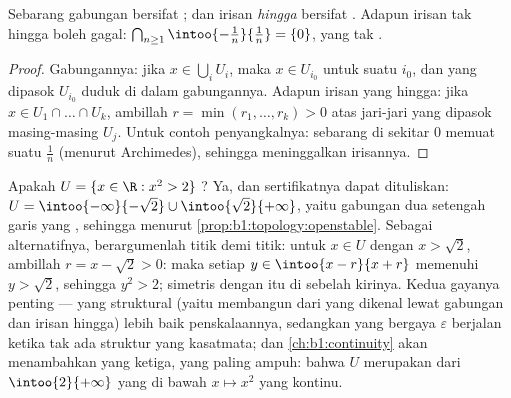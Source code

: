 \begin{proposition}\label{prop:b1:topology:openstable}
Sebarang gabungan  bersifat ; dan irisan \emph{hingga}  bersifat . Adapun irisan tak hingga boleh gagal:
$\bigcap_{n \geq 1} \intoo{-\frac 1n}{\frac 1n} = \{0\}$, yang tak .
\end{proposition}

\begin{proof}
Gabungannya: jika $x \in \bigcup_i U_i$, maka $x \in U_{i_0}$ untuk suatu $i_0$,
dan  yang dipasok $U_{i_0}$ duduk di dalam gabungannya. Adapun irisan
yang hingga: jika $x \in U_1 \cap \dots \cap U_k$, ambillah $r = \min(r_1,
\dots, r_k) > 0$ atas jari-jari yang dipasok masing-masing $U_j$. Untuk
contoh penyangkalnya: sebarang  di sekitar $0$ memuat suatu $\frac{1}{n}$
(menurut Archimedes), sehingga meninggalkan irisannya.
\end{proof}

\begin{example}\label{ex:b1:topology:radii}
Apakah $U = \{x \in \R : x^2 > 2\}$ ? Ya, dan sertifikatnya
dapat dituliskan: $U = \intoo{-\infty}{-\sqrt2} \cup
\intoo{\sqrt2}{+\infty}$, yaitu gabungan dua setengah garis yang , sehingga 
menurut \cref{prop:b1:topology:openstable}. Sebagai alternatifnya, berargumenlah
titik demi titik: untuk $x \in U$ dengan $x > \sqrt 2$, ambillah $r = x -
\sqrt2 > 0$: maka setiap $y \in \intoo{x - r}{x + r}$ memenuhi $y >
\sqrt 2$, sehingga $y^2 > 2$; simetris dengan itu di sebelah kirinya. Kedua
gayanya penting --- yang struktural (yaitu membangun dari 
yang dikenal lewat gabungan dan irisan hingga) lebih baik penskalaannya, sedangkan yang
bergaya $\varepsilon$ berjalan ketika tak ada struktur yang kasatmata; dan
\cref{ch:b1:continuity} akan menambahkan yang ketiga, yang paling ampuh:
bahwa $U$ merupakan  dari $\intoo{2}{+\infty}$ yang  di bawah
$x \mapsto x^2$ yang kontinu.
\end{example}


